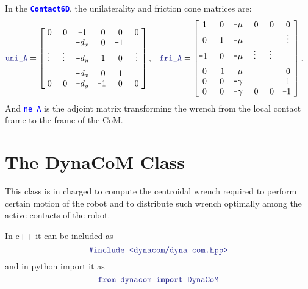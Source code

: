 \documentclass[12pt]{article}
\newcommand{\code}[2][Blue]{\textcolor{#1}{\texttt{#2}}}
\newcommand{\codebf}[2][Blue]{\textcolor{#1}{\texttt{\textbf{#2}}}}
\begin{document}
In the \codebf{Contact6D}, the unilaterality and friction cone matrices are:
%
\begin{align*}
    &\code{uni\_A} = \begin{bmatrix}
       ~0        & ~0     & \texttt{-}1   & ~0 & ~0  & ~0~ \\
               &        & \texttt{-}d_x & ~0 & \texttt{-}1 &  \\
       \vspace{2mm}\vdots  & \vdots & \texttt{-}d_y & ~1 & ~0 & \vdots \\
               &         & \texttt{-}d_x & ~0 & ~1 &   \\
       ~0        &   ~0    & \texttt{-}d_y & \texttt{-}1 & ~0 & ~0~ \\
    \end{bmatrix}, &&
    \code{fri\_A} = \begin{bmatrix}
        ~1 & ~0 & \texttt{-}\mu & ~0   & ~0  & ~0~ \\
        ~0 & ~1 & \texttt{-}\mu &     &    &  \vdots \\
        \texttt{-}1 & ~0 & \texttt{-}\mu & \vspace{2mm}\vdots   & \vdots   &    \\
        ~0 & \texttt{-}1 & \texttt{-}\mu &    &    & ~0~ \\
        ~0 & ~0 & \texttt{-}\gamma &  &    & ~1~ \\
        ~0 & ~0 & \texttt{-}\gamma &  ~0 &  ~0  & \texttt{-}1~
    \end{bmatrix}.
\end{align*}
 And \code{ne\_A} is the adjoint matrix transforming the wrench from the local contact frame to the frame of the CoM.

\clearpage

\section{The DynaCoM Class}

    This class is in charged to compute the centroidal wrench required to perform certain motion of the robot and to distribute such wrench optimally among the active contacts of the robot.

    In c++ it can be included as
    \begin{equation*}
    \code{\#include <dynacom/dyna\_com.hpp>}
    \end{equation*}
    and in python import it as
    \begin{equation*}
    \codebf{from }\code{dynacom }\codebf{import }\code{DynaCoM}
    \end{equation*}
\end{document}
